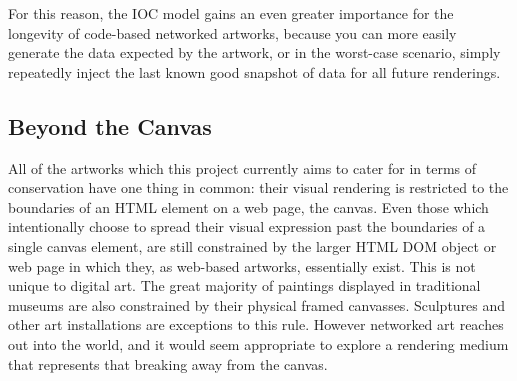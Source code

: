 For this reason, the IOC model gains an even greater importance for the longevity of code-based networked artworks, because you can more easily generate the data expected by the artwork, or in the worst-case scenario, simply repeatedly inject the last known good snapshot of data for all future renderings.

\subsection{Beyond the Canvas}

All of the artworks which this project currently aims to cater for in terms of conservation have one thing in common: their visual rendering is restricted to the boundaries of an HTML element on a web page, the canvas. Even those which intentionally choose to spread their visual expression past the boundaries of a single canvas element, are still constrained by the larger HTML DOM object or web page in which they, as web-based artworks, essentially exist. This is not unique to digital art. The great majority of paintings displayed in traditional museums are also constrained by their physical framed canvasses. Sculptures and other art installations are exceptions to this rule. However networked art reaches out into the world, and it would seem appropriate to explore a rendering medium that represents that breaking away from the canvas.